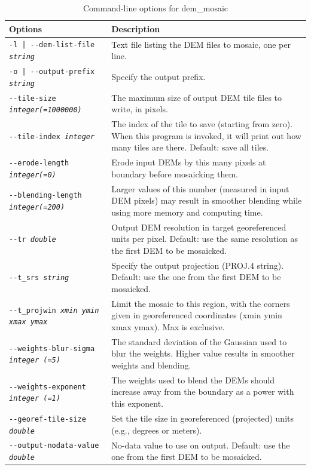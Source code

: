 \begin{longtable}{|l|p{10cm}|}
\caption{Command-line options for dem\_mosaic}
\label{tbl:demmosaic}
\endfirsthead
\endhead
\endfoot
\endlastfoot
\hline
Options & Description \\
\hline \hline

\texttt{-l | -\/-dem-list-file \textit{string}}  &
Text file listing the DEM files to mosaic, one per line.
\\ \hline
\texttt{-o | -\/-output-prefix  \textit{string} } &
Specify the output prefix.
\\ \hline
\texttt{-\/-tile-size \textit{integer(=1000000)}} &
The maximum size of output DEM tile files to write, in pixels.
\\ \hline
\texttt{-\/-tile-index \textit{integer}} &
The index of the tile to save (starting from zero). When this program is invoked, it will print  out how many tiles are there. Default: save all tiles.
\\ \hline
\texttt{-\/-erode-length \textit{integer(=0)} }  &
Erode input DEMs by this many pixels at boundary before mosaicking them.
\\ \hline
\texttt{-\/-blending-length \textit{integer(=200)}} &
Larger values of this number (measured in input DEM pixels) may result
in smoother blending while using more memory and computing time.
\\ \hline
\texttt{-\/-tr \textit{double}  } &
Output DEM resolution in target georeferenced units per pixel. Default: use the same resolution as the first DEM to be mosaicked.
\\ \hline
\texttt{-\/-t\_srs \textit{string} } &
Specify the output projection (PROJ.4 string). Default: use the one from the first DEM to be mosaicked.
\\ \hline
\texttt{-\/-t\_projwin \textit{xmin ymin xmax ymax} } &
Limit the mosaic to this region, with the corners given in georeferenced coordinates (xmin ymin xmax ymax). Max is exclusive.
\\ \hline
\texttt{-\/-weights-blur-sigma \textit{integer (=5)} } &
The standard deviation of the Gaussian used to blur the weights. Higher value results in smoother weights and blending.
\\ \hline
\texttt{-\/-weights-exponent \textit{integer (=1)} } &
The weights used to blend the DEMs should increase away from the boundary as a power with this exponent.
\\ \hline
\texttt{-\/-georef-tile-size \textit{double}} &
Set the tile size in georeferenced (projected) units (e.g., degrees or meters).
\\ \hline
\texttt{-\/-output-nodata-value \textit{double}} &
No-data value to use on output. Default: use the one from the first DEM to be mosaicked.
\\ \hline


\end{longtable}
